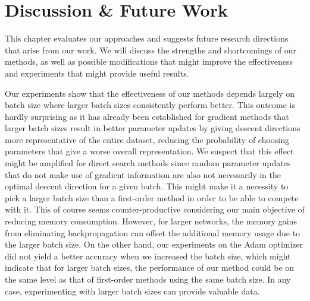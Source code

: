 \chapter{Discussion \& Future Work} \label{chapter:discussion}
This chapter evaluates our approaches and suggests 
future research directions that arise from our work.
We will discuss the strengths and shortcomings 
of our methods, as well as possible modifications that 
might improve the effectiveness and experiments that might 
provide useful results. 

Our experiments show that the effectiveness of our methods
depends largely on batch size where larger batch sizes 
consistently perform better. This outcome is hardly 
surprising as it has already been established for 
gradient methods that larger batch sizes result in better 
parameter updates by giving descent directions more
representative of the entire dataset, reducing the
probability of choosing parameters that give a worse 
overall representation.  We suspect that 
this effect might be amplified for direct search methods
since random parameter updates that do not make use of 
gradient information are also not necessarily in the 
optimal descent direction for a given batch. 
This might make it a necessity to 
pick a larger batch size than a first-order
method in order to be able to compete with it. 
This of course seems counter-productive considering our 
main objective of reducing memory consumption. However,
for larger networks, the memory gains from 
eliminating backpropagation can offset
the additional memory usage due to the larger batch size.
On the other hand, our experiments on the Adam optimizer
did not yield a better accuracy when we increased the 
batch size, which might indicate that for larger 
batch sizes, the performance of our method could 
be on the same level as that of first-order methods using the same 
batch size.
In any case, experimenting with larger batch sizes 
can provide valuable data.   

